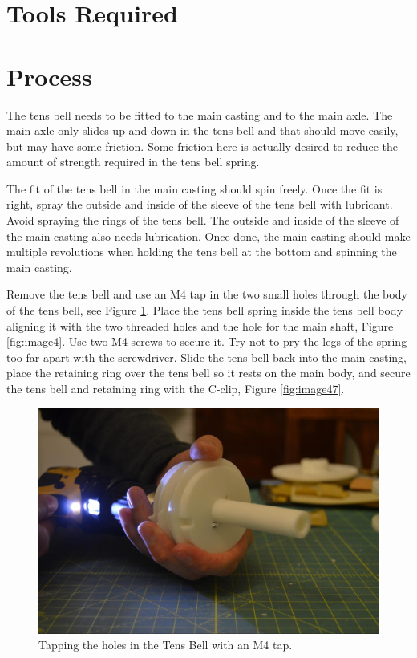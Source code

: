 \documentclass[openany]{book}
\begin{document}
\section{Tools Required}

\section{Process}

The tens bell needs to be fitted to the main casting and to the main axle. The main axle only slides up and down in the tens bell and that should move easily, but may have some friction. Some friction here is actually desired to reduce the amount of strength required in the tens bell spring.

The fit of the tens bell in the main casting should spin freely. Once the fit is right, spray the outside and inside of the sleeve of the tens bell with lubricant. Avoid spraying the rings of the tens bell. The outside and inside of the sleeve of the main casting also needs lubrication. Once done, the main casting should make multiple revolutions when holding the tens bell at the bottom and spinning the main casting.

Remove the tens bell and use an M4 tap in the two small holes through the body of the tens bell, see Figure \ref{fig:image54}. Place the tens bell spring inside the tens bell body aligning it with the two threaded holes and the hole for the main shaft, Figure \ref{fig:image4}. Use two M4 screws to secure it. Try not to pry the legs of the spring too far apart with the screwdriver. Slide the tens bell back into the main casting, place the retaining ring over the tens bell so it rests on the main body, and secure the tens bell and retaining ring with the C-clip, Figure \ref{fig:image47}.

\begin{figure}[!ht]
	\centering
	\includegraphics[width=.75\textwidth]{images/image54.jpg}
	\caption{Tapping the holes in the Tens Bell with an M4 tap.}
	\label{fig:image54}	
\end{figure}
\end{document}
